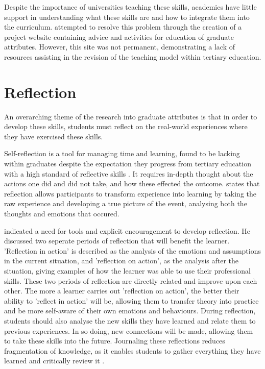 \documentclass{l4proj}
\begin{document}
Despite the importance of universities teaching these skills, academics have little support in understanding what these skills are and how to integrate them into the curriculum. \citet{litchfield_contextualising_2010} attempted to resolve this problem through the creation of a project website containing advice and activities for education of graduate attributes. However, this site was not permanent, demonstrating a lack of resources assisting in the revision of the teaching model within tertiary education. 


\section{Reflection} \label{backgroundReflection}

An overarching theme of the research into graduate attributes is that in order to develop these skills, students must reflect on the real-world experiences where they have exercised these skills. 

Self-reflection is a tool for managing time and learning, found to be lacking within graduates \citep{thurner_development_2020} despite the expectation they progress from tertiary education with a high standard of reflective skills \citep{bruno_reflective_2018}. It requires in-depth thought about the actions one did and did not take, and how these effected the outcome. \citet{boud_using_2001} states that reflection allows participants to transform experience into learning by taking the raw experience and developing a true picture of the event, analysing both the thoughts and emotions that occured. 

\citet{schon_reflective_1984} indicated a need for tools and explicit encouragement to develop reflection. He discussed two seperate periods of reflection that will benefit the learner. 'Reflection in action' is described as the analysis of the emotions and assumptions in the current situation, and 'reflection on action', as the analysis after the situation, giving examples of how the learner was able to use their professional skills. These two periods of reflection are directly related and improve upon each other. The more a learner carries out 'reflection on action', the better their ability to 'reflect in action' will be, allowing them to transfer theory into practice and be more self-aware of their own emotions and behaviours. During reflection, students should also analyse the new skills they have learned and relate them to previous experiences. In so doing, new connections will be made, allowing them to take these skills into the future. Journaling these reflections reduces fragmentation of knowledge, as it enables students to gather everything they have learned and critically review it \citep{oconnell_case_2011}.
\end{document}

